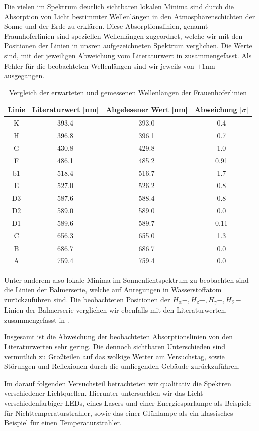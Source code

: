 Die vielen im Spektrum deutlich sichtbaren lokalen Minima sind durch die Absorption von Licht bestimmter Wellenlängen in den Atmosphärenschichten der Sonne und der Erde zu erklären. Diese Absorptionslinien, genannt \glqq{}Fraunhoferlinien\grqq{} sind speziellen Wellenlängen zugeordnet, welche wir mit den Positionen der Linien in unsren aufgezeichneten Spektrum verglichen. Die Werte sind, mit der jeweiligen Abweichung vom Literaturwert in  zusammengefasst. Als Fehler für die beobachteten Wellenlängen sind wir jeweils von $\pm 1\si{\nano\meter}$ ausgegangen.

\begin{table}[h]
  \centering
  \caption{Vergleich der erwarteten und gemessenen Wellenlängen der Frauenhoferlinien}
  \vspace*{0.5em}
  \begin{tabular}{c|c|c|c}
      \hline
      Linie & Literaturwert [nm] & Abgelesener Wert [nm] & Abweichung [$\sigma$] \\
      \hline
      K  & 393.4 & 393.0 & 0.4 \\
      H  & 396.8 & 396.1 & 0.7 \\
      G  & 430.8 & 429.8 & 1.0 \\
      F  & 486.1 & 485.2 & 0.91 \\
      b1 & 518.4 & 516.7 & 1.7 \\
      E  & 527.0 & 526.2 & 0.8 \\
      D3 & 587.6 & 588.4 & 0.8 \\
      D2 & 589.0 & 589.0 & 0.0 \\
      D1 & 589.6 & 589.7 & 0.11 \\
      C  & 656.3 & 655.0 & 1.3 \\
      B  & 686.7 & 686.7 & 0.0 \\
      A  & 759.4 & 759.4 & 0.0 \\
      \hline
  \end{tabular}
  \label{tab:frauenhofer_vergleich_zsmf}
\end{table}

Unter anderem also lokale Minima im Sonnenlichtspektrum zu beobachten sind die Linien der Balmerserie, welche auf Anregungen in Wasserstoffatom zurückzuführen sind. Die beobachteten Positionen der $H_{\alpha}-, H_{\beta}-, H_{\gamma}-, H_{\delta}-$Linien der Balmerserie verglichen wir ebenfalls mit den Literaturwerten, zusammengefasst in \tabref{}.

Insgesamt ist die Abweichung der beobachteten Absorptionslinien von den Literaturwerten sehr gering. Die dennoch sichtbaren Unterschieden sind vermutlich zu Großteilen auf das wolkige Wetter am Versuchstag, sowie Störungen und Reflexionen durch die umliegenden Gebäude zurückzuführen.

Im darauf folgenden Versuchsteil betrachteten wir qualitativ die Spektren verschiedener Lichtquellen. Hierunter untersuchten wir das Licht verschiedenfarbiger LEDs, eines Lasers und einer Energiesparlampe als Beispiele für Nichttemperaturstrahler, sowie das einer Glühlampe als ein klassisches Beispiel für einen Temperaturstrahler.
